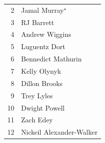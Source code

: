 \documentclass[11pt,letterpaper]{article}
\begin{document}
\begin{table}[h]
\begin{minipage}{0.45\textwidth}
\begin{tabular}{r l}
      2  & Jamal Murray$^{\star}$           \\
      3  & RJ Barrett                       \\
      4  & Andrew Wiggins                   \\
      5  & Luguentz Dort                    \\
      6  & Bennedict Mathurin               \\
      7  & Kelly Olynyk                     \\
      8  & Dillon Brooks                    \\
      9  & Trey Lyles                       \\
      10 & Dwight Powell                    \\
      11 & Zach Edey                        \\
      12 & Nickeil Alexander-Walker         \\
      \bottomrule
    \end{tabular}
  \end{minipage}
\end{table}
\end{document}
